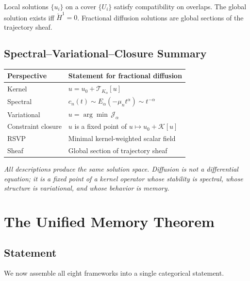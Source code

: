 \documentclass[12pt]{article}
\begin{document}
Local solutions $\{u_i\}$ on a cover $\{U_i\}$ satisfy compatibility on
overlaps. The global solution exists iff $\check{H}^1 = 0$. Fractional
diffusion solutions are global sections of the trajectory sheaf.

\subsection{Spectral--Variational--Closure Summary}

\medskip
\begin{center}
\renewcommand{\arraystretch}{1.4}
\begin{tabular}{ll}
\toprule
\textbf{Perspective} & \textbf{Statement for fractional diffusion} \\
\midrule
Kernel & $u = u_0 + \mathcal{T}_{K_\alpha}[u]$ \\
Spectral & $c_n(t) \sim E_\alpha(-\mu_n t^\alpha) \sim t^{-\alpha}$ \\
Variational & $u = \arg\min\,\mathcal{J}_\alpha$ \\
Constraint closure & $u$ is a fixed point of $u \mapsto u_0 + \mathcal{K}[u]$ \\
RSVP & Minimal kernel-weighted scalar field \\
Sheaf & Global section of trajectory sheaf \\
\bottomrule
\end{tabular}
\end{center}
\medskip

\begin{center}
\textit{All descriptions produce the same solution space.
Diffusion is not a differential equation; it is a fixed point
of a kernel operator whose stability is spectral, whose structure
is variational, and whose behavior is memory.}
\end{center}

\section{The Unified Memory Theorem}
\label{sec:unified}

\subsection{Statement}

We now assemble all eight frameworks into a single categorical statement.
\end{document}
